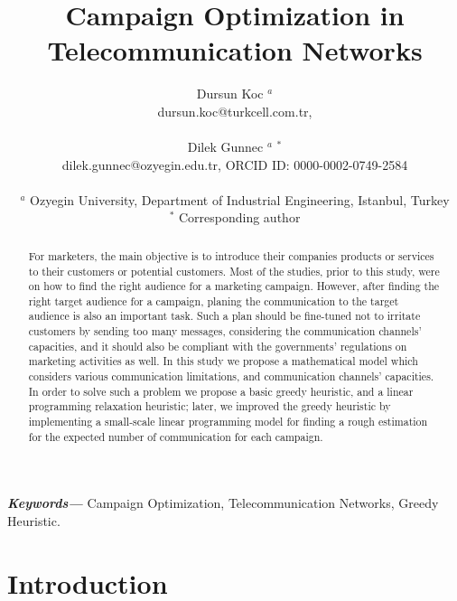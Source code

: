 \documentclass[11pt]{article}
\title{Campaign Optimization in Telecommunication Networks\\}
\author{Dursun Koc $^{a}$ \\ 
	dursun.koc@turkcell.com.tr, \\\\
	Dilek Gunnec $^{a}$ $^{\ast}$\\ 
	dilek.gunnec@ozyegin.edu.tr, ORCID ID: 0000-0002-0749-2584 \\\\
$^{a}$ Ozyegin University, Department of Industrial Engineering, Istanbul, Turkey \\ 
$^{\ast}$ Corresponding author \\ }
\date{}
\providecommand{\keywords}[1]
{
  \small	
  \textbf{\textit{Keywords---}} #1
}
\begin{document}
\maketitle
\begin{abstract}
For marketers, the main objective is to introduce their companies products or services to their customers or potential customers. Most of the studies, prior to this study, were on how to find the right audience for a marketing campaign. However, after finding the right target audience for a campaign, planing the communication to the target audience is also an important task. Such a plan should be fine-tuned not to irritate customers by sending too many messages, considering the communication channels' capacities, and it should also be compliant with the governments' regulations on marketing activities as well. In this study we propose a mathematical model which considers various communication limitations, and communication channels' capacities. In order to solve such a problem we propose a basic greedy heuristic, and a linear programming relaxation heuristic; later, we improved the greedy heuristic by implementing a small-scale linear programming model for finding a rough estimation for the expected number of communication for each campaign.\end{abstract}\hspace{10pt}

\keywords{Campaign Optimization, Telecommunication Networks, Greedy Heuristic.}

\newpage

\section{Introduction}
\end{document}
